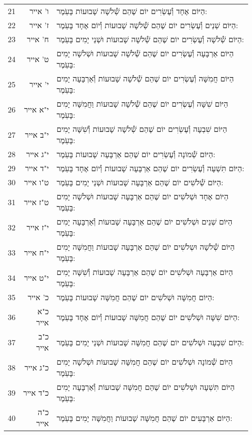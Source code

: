 \documentclass[twoside, openany, parskip=half, 11pt]{book}
\begin{document}
\begin{scriptsize}
\begin{longtable}{ l | r | p{} }
21 & ו' אייר & הַיּוֹם אֶחָד וְ֯עֶשְׂרִים יוֹם שֶׁהֵם שְׁ֯לֹשָׁה שָׁבוּעוֹת בָּעֹֽמֶר: \\
22 & ז' אייר & הַיּוֹם שְׁנֵים וְ֯עֶשְׂרִים יוֹם שֶׁהֵם שְׁ֯לֹשָׁה שָׁבוּעוֹת וְ֯יוֹם אֶחָד בָּעֹֽמֶר: \\
23 & ח' אייר & הַיּוֹם שְׁ֯לֹשָׁה וְ֯עֶשְׂרִים יוֹם שֶׁהֵם שְׁ֯לֹשָׁה שָׁבוּעוֹת וּשְׁנֵי יָמִים בָּעֹֽמֶר: \\
24 & ט' אייר & הַיּוֹם אַרְבָּעָה וְ֯עֶשְׂרִים יוֹם שֶׁהֵם שְׁ֯לֹשָׁה שָׁבוּעוֹת וּשְׁלֹשָׁה יָמִים בָּעֹֽמֶר: \\
25 & י' אייר & הַיּוֹם חֲמִשָּׁה וְ֯עֶשְׂרִים יוֹם שֶׁהֵם שְׁ֯לֹשָׁה שָׁבוּעוֹת וְ֯אַרְבָּעָה יָמִים בָּעֹֽמֶר: \\
26 & י"א אייר & הַיּוֹם שִׁשָּׁה וְ֯עֶשְׂרִים יוֹם שֶׁהֵם שְׁ֯לֹשָׁה שָׁבוּעוֹת וַחֲמִשָּׁה יָמִים בָּעֹֽמֶר: \\
27 & י"ב אייר & הַיּוֹם שִׁבְעָה וְ֯עֶשְׂרִים יוֹם שֶׁהֵם שְׁ֯לֹשָׁה שָׁבוּעוֹת וְ֯שִׁשָּׁה יָמִים בָּעֹֽמֶר: \\
28 & י"ג אייר & הַיּוֹם שְׁ֯מוֹנָה וְ֯עֶשְׂרִים יוֹם שֶׁהֵם אַרְבָּעָה שָׁבוּעוֹת בָּעֹֽמֶר: \\
29 & י"ד אייר & הַיּוֹם תִּשְׁעָה וְ֯עֶשְׂרִים יוֹם שֶׁהֵם אַרְבָּעָה שָׁבוּעוֹת וְ֯יוֹם אֶחָד בָּעֹֽמֶר: \\
30 & ט"ו אייר & הַיּוֹם שְׁ֯לֹשִׁים יוֹם שֶׁהֵם אַרְבָּעָה שָׁבוּעוֹת וּשְׁנֵי יָמִים בָּעֹֽמֶר: \\
31 & ט"ז אייר & הַיּוֹם אֶחָד וּשְׁלֹשִׁים יוֹם שֶׁהֵם אַרְבָּעָה שָׁבוּעוֹת וּשְׁלֹשָׁה יָמִים בָּעֹֽמֶר: \\
32 & י"ז אייר & הַיּוֹם שְׁנֵים וּשְׁלֹשִׁים יוֹם שֶׁהֵם אַרְבָּעָה שָׁבוּעוֹת וְ֯אַרְבָּעָה יָמִים בָּעֹֽמֶר: \\
33 & י"ח אייר & הַיּוֹם שְׁ֯לֹשָׁה וּשְלֹשִׁים יוֹם שֶׁהֵם אַרְבָּעָה שָׁבוּעוֹת וַחֲמִשָּׁה יָמִים בָּעֹֽמֶר: \\
34 & י"ט אייר & הַיּוֹם אַרְבָּעָה וּשְׁלֹשִׁים יוֹם שֶׁהֵם אַרְבָּעָה שָׁבוּעוֹת וְ֯שִׁשָּׁה יָמִים בָּעֹֽמֶר: \\
35 & כ' אייר & הַיּוֹם חֲמִשָּׁה וּשְׁלֹשִׁים יוֹם שֶׁהֵם חֲמִשָּׁה שָׁבוּעוֹת בָּעֹֽמֶר: \\
36 & כ"א אייר & הַיּוֹם שִׁשָּׁה וּשְׁלֹשִׁים יוֹם שֶׁהֵם חֲמִשָּׁה שָׁבוּעוֹת וְ֯יוֹם אֶחָד בָּעֹֽמֶר: \\
37 & כ"ב אייר & הַיּוֹם שִׁבְעָה וּשְׁלֹשִׁים יוֹם שֶׁהֵם חֲמִשָּׁה שָׁבוּעוֹת וּשְׁנֵי יָמִים בָּעֹֽמֶר: \\
38 & כ"ג אייר & הַיּוֹם שְׁ֯מוֹנָה וּשְׁלֹשִׁים יוֹם שֶׁהֵם חֲמִשָּׁה שָׁבוּעוֹת וּשְׁלֹשָׁה יָמִים בָּעֹֽמֶר: \\
39 & כ"ד אייר & הַיּוֹם תִּשְׁעָה וּשְׁלֹשִׁים יוֹם שֶׁהֵם חֲמִשָּׁה שָׁבוּעוֹת וְ֯אַרְבָּעָה יָמִים בָּעֹֽמֶר: \\
40 & כ"ה אייר & הַיּוֹם אַרְבָּעִים יוֹם שֶׁהֵם חֲמִשָּׁה שָׁבוּעוֹת וַחֲמִשָּׁה יָמִים בָּעֹֽמֶר: \\

\end{longtable}
\end{scriptsize}
\end{document}
